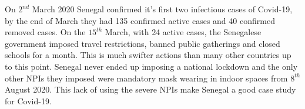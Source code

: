 \documentclass[11pt,a4paper]{article}
\theoremstyle{break}
\begin{document}
  On $2^{nd}$ March 2020 Senegal confirmed it's first two infectious cases of Covid-19, by the end of March they had 135 confirmed active cases and 40 confirmed removed cases. On the $15^{th}$ March, with 24 active cases, the Senegalese government imposed travel restrictions, banned public gatherings and closed schools for a month. This is much swifter actions than many other countries up to this point. Senegal never ended up imposing a national lockdown and the only other NPIs they imposed were mandatory mask wearing in indoor spaces from $8^{th}$ August 2020. This lack of using the severe NPIs make Senegal a good case study for Covid-19.

  \begin{figure}[H]
    \centering
\end{figure}
\end{document}
